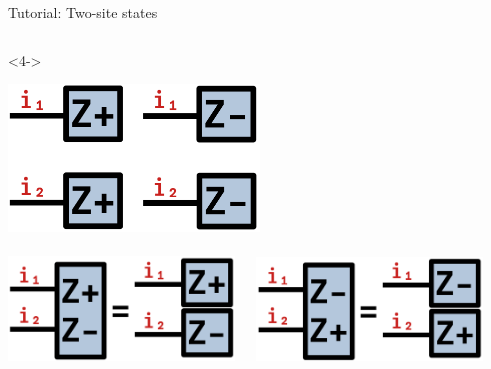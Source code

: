 \begin{frame}[fragile]{Tutorial: Two-site states}
\begin{columns}
\begin{column}{5cm}
\begin{onlyenv}<4->
\vspace*{0.0cm}
~\\
\begin{center}
\includegraphics[width=0.5\textwidth]{
  slides/assets/Zp1Zm1Zp2Zm2.png
} \\
~\\
\includegraphics[width=0.45\textwidth]{
  slides/assets/ZpZm12_eq_Zp1Zm2.png
}\ \ \ 
\includegraphics[width=0.45\textwidth]{
  slides/assets/ZmZp12_eq_Zm1Zp2.png
}
\end{center}
\vspace*{0.0cm}
\end{onlyenv}

\end{column}

\end{columns}

\end{frame}
